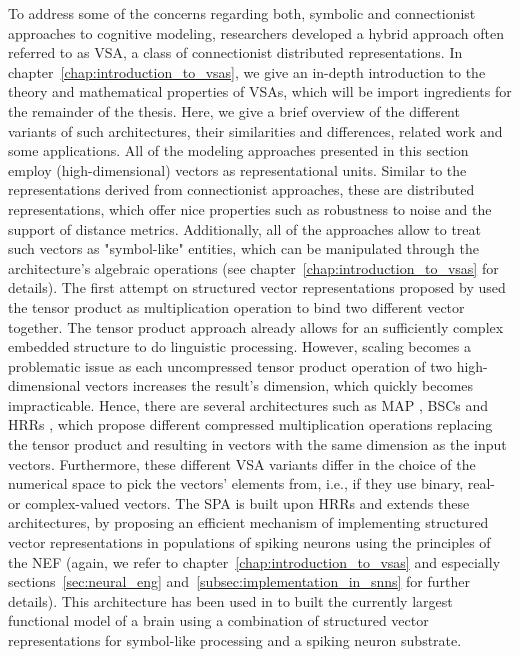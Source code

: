 To address some of the concerns regarding both, symbolic and connectionist approaches to cognitive modeling, researchers developed a hybrid approach often referred to as \acf{VSA}, a class of connectionist distributed representations.
In chapter~\ref{chap:introduction_to_vsas}, we give an in-depth introduction to the theory and mathematical properties of \acp{VSA}, which will be import ingredients for the remainder of the thesis.
Here, we give a brief overview of the different variants of such architectures, their similarities and differences, related work and some applications.
All of the modeling approaches presented in this section employ (high-dimensional) vectors as representational units.
Similar to the representations derived from connectionist approaches, these are distributed representations, which offer nice properties such as robustness to noise and the support of distance metrics.
Additionally, all of the approaches allow to treat such vectors as "symbol-like" entities, which can be manipulated through the architecture's algebraic operations (see chapter~\ref{chap:introduction_to_vsas} for details).
The first attempt on structured vector representations proposed by \textcite{Smolensky1990} used the tensor product as multiplication operation to bind two different vector together.
The tensor product approach already allows for an sufficiently complex embedded structure to do linguistic processing.
However, scaling becomes a problematic issue as each uncompressed tensor product operation of two high-dimensional vectors increases the result's dimension, which quickly becomes impracticable.
Hence, there are several architectures such as \ac{MAP} \parencite{Gayler1998, Gayler2003}, \acp{BSC} \parencite{Kanerva1988} and \acp{HRR} \parencite{Plate1991, Plate1994}, which propose different compressed multiplication operations replacing the tensor product and resulting in vectors with the same dimension as the input vectors.
Furthermore, these different \ac{VSA} variants differ in the choice of the numerical space to pick the vectors' elements from, i.e., if they use binary, real- or complex-valued vectors. 
The \ac{SPA} \parencite{Eliasmith2013} is built upon \acp{HRR} and extends these architectures, by proposing an efficient mechanism of implementing structured vector representations in populations of spiking neurons using the principles of the \ac{NEF} \parencite{Eliasmith2003} (again, we refer to chapter~\ref{chap:introduction_to_vsas} and especially sections~\ref{sec:neural_eng} and~\ref{subsec:implementation_in_snns} for further details).   
This architecture has been used in \textcite{Eliasmith2012} to built the currently largest functional model of a brain using a combination of structured vector representations for symbol-like processing and a spiking neuron substrate.

